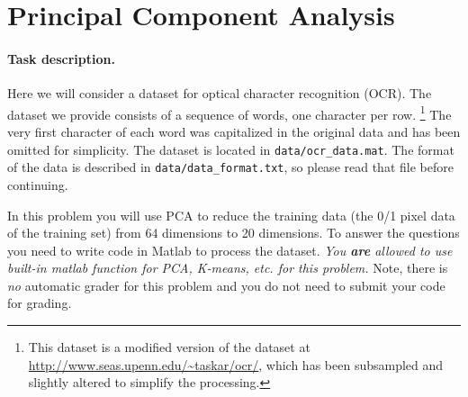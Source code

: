 \section{Principal Component Analysis }

\paragraph{Task description.}
Here we will consider a dataset for optical character recognition (OCR).  
The dataset we provide consists of a sequence of words, one character per row.%
\footnote{This dataset is a modified version of the dataset at
\url{http://www.seas.upenn.edu/~taskar/ocr/}, which has been
subsampled and slightly altered to simplify the processing.}
%
The very first character of each word was capitalized in the original
data and has been omitted for simplicity. The dataset is located in 
{\tt data/ocr\_data.mat}. The format of the data is described in 
{\tt data/data\_format.txt}, so please read that file before continuing.

In this problem you will use PCA to reduce the training data (the 0/1
pixel data of the training set) from 64 dimensions to 20 dimensions. To 
answer the questions you need to write code in Matlab to process
the dataset. {\em You {\bf are} allowed to use built-in matlab function for PCA, K-means, etc. for this problem.}
Note, there is {\em no} automatic grader for this problem
and you do not need to submit your code for grading.

